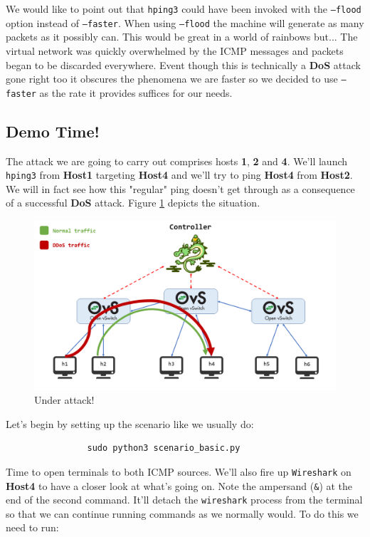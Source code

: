 \documentclass[12pt]{report}
\begin{document}
			We would like to point out that \texttt{hping3} could have been invoked with the \texttt{--flood} option instead of \texttt{--faster}. When using \texttt{--flood} the machine will generate as many packets as it possibly can. This would be great in a world of rainbows but... The virtual network was quickly overwhelmed by the ICMP messages and packets began to be discarded everywhere. Event though this is technically a \textbf{DoS} attack gone right too it obscures the phenomena we are faster so we decided to use \texttt{--faster} as the rate it provides suffices for our needs.

		\subsection{Demo Time!}
			The attack we are going to carry out comprises hosts \textbf{1}, \textbf{2} and \textbf{4}. We'll launch \texttt{hping3} from \textbf{Host1} targeting \textbf{Host4} and we'll try to ping \textbf{Host4} from \textbf{Host2}. We will in fact see how this "regular" ping doesn't get through as a consequence of a successful \textbf{DoS} attack. Figure \ref{f:dos_atk} depicts the situation.

			\begin{figure}
				\centering
				\includegraphics[scale = 1]{scenario_ddos.png}
				\caption{Under attack!}
				\label{f:dos_atk}
			\end{figure}

			Let's begin by setting up the scenario like we usually do:

			\begin{verbatim}
				sudo python3 scenario_basic.py
			\end{verbatim}

			Time to open terminals to both ICMP sources. We'll also fire up \texttt{Wireshark} on \textbf{Host4} to have a closer look at what's going on. Note the ampersand (\texttt{\&}) at the end of the second command. It'll detach the \texttt{wireshark} process from the terminal so that we can continue running commands as we normally would. To do this we need to run:
\end{document}
